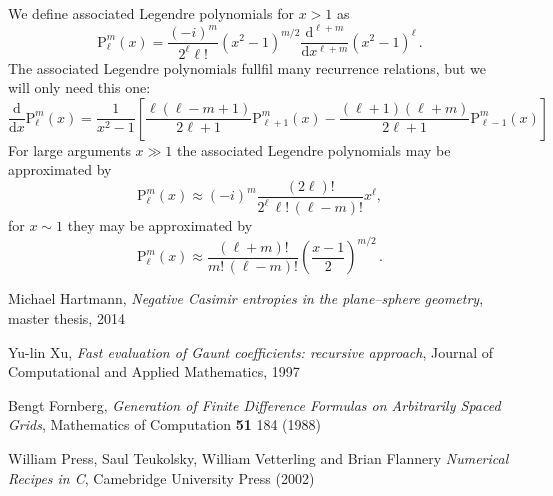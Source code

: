 \documentclass[superscriptaddress,prb]{revtex4-1}
\newcommand{\imag}{i} %
\newcommand{\Plm}[2]{{\text{P}_{#1}^{#2}}}
\begin{document}
We define associated Legendre polynomials for $x>1$ as
\begin{equation}
\Plm{\ell}{m}(x) = \frac{(-\imag)^m}{2^\ell \ell!} \left(x^2-1\right)^{m/2} \frac{\mathrm{d}^{\ell+m}}{\mathrm{d}x^{\ell+m}} \left(x^2-1\right)^\ell \,.
\end{equation}
The associated Legendre polynomials fullfil many recurrence relations, but we will only need this one:
\begin{equation}
\label{appendix:dPlm}
\frac{\mathrm{d}}{\mathrm{d}x} \Plm{\ell}{m}(x) = \frac{1}{x^2-1} \left[
\frac{\ell(\ell-m+1)}{2\ell+1} \Plm{\ell+1}{m}(x)
-\frac{(\ell+1)(\ell+m)}{2\ell+1} \Plm{\ell-1}{m}(x)
\right]
\end{equation}
For large arguments $x\gg 1$ the associated Legendre polynomials may be approximated by
\begin{equation}
\label{appendix:Plm_gg}
\Plm{\ell}{m}(x) \approx (-\imag)^m \frac{(2\ell)!}{2^\ell \, \ell! \, (\ell-m)!} x^\ell,
\end{equation}
for $x\sim1$ they may be approximated by
\begin{equation}
\label{appendix:Plm_1}
\Plm{\ell}{m}(x) \approx \frac{(\ell+m)!}{m! \, (\ell-m)!} \left(\frac{x-1}{2}\right)^{m/2} \,.
\end{equation}



\begin{thebibliography}{99}

  Michael Hartmann,
  \emph{Negative Casimir entropies in the plane–sphere geometry}, master thesis, 2014

  Yu-lin Xu,
  \emph{Fast evaluation of Gaunt coefficients: recursive approach}, Journal of Computational and Applied Mathematics, 1997

  Bengt Fornberg,
  \emph{Generation of Finite Difference Formulas on Arbitrarily Spaced Grids}, Mathematics of Computation \textbf{51} 184 (1988)

  William Press, Saul Teukolsky, William Vetterling and Brian Flannery
  \emph{Numerical Recipes in C}, Camebridge University Press (2002)

\end{thebibliography}
\end{document}
